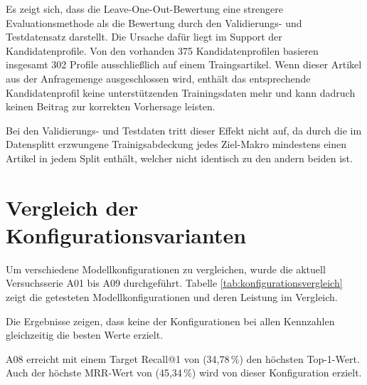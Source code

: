 Es zeigt sich, dass die Leave-One-Out-Bewertung eine strengere Evaluationsmethode als die Bewertung durch den Validierungs- und Testdatensatz darstellt.
Die Ursache dafür liegt im Support der Kandidatenprofile. Von den vorhanden 375 Kandidatenprofilen basieren insgesamt 302 Profile ausschließlich auf einem Traingsartikel.
Wenn dieser Artikel aus der Anfragemenge ausgeschlossen wird, enthält das entsprechende Kandidatenprofil keine unterstützenden Trainingsdaten mehr und kann dadruch keinen Beitrag zur korrekten Vorhersage leisten.

Bei den Validierungs- und Testdaten tritt dieser Effekt nicht auf, da durch die im Datensplitt erzwungene Trainigsabdeckung jedes Ziel-Makro \parencite{EPLAN-Makros} mindestens einen Artikel in jedem Split enthält, welcher nicht identisch zu den andern beiden ist.


\section{Vergleich der Konfigurationsvarianten}

Um verschiedene Modellkonfigurationen zu vergleichen, wurde die aktuell Versuchsserie A01 bis A09 durchgeführt. 
Tabelle \ref{tab:konfigurationsvergleich} zeigt die getesteten Modellkonfigurationen und deren Leistung im Vergleich.




Die Ergebnisse zeigen, dass keine der Konfigurationen bei allen Kennzahlen gleichzeitig die besten Werte erzielt.

A08 erreicht mit einem Target Recall@1 von (34,78\,\%) den höchsten Top-1-Wert. Auch der höchste MRR-Wert von (45,34\,\%) wird von dieser Konfiguration erzielt.

